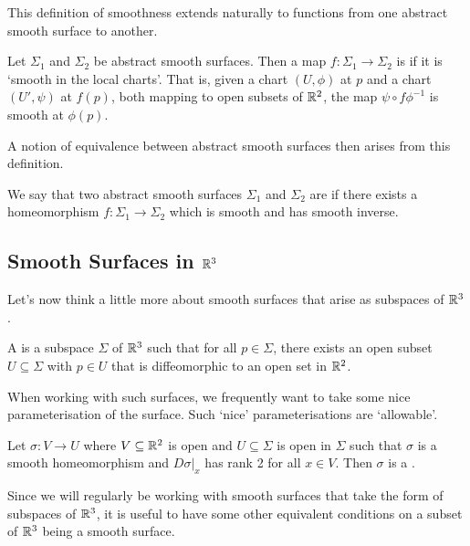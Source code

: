 \documentclass[a4paper]{article}
\begin{document}
This definition of smoothness extends naturally to functions from one abstract smooth surface to another.

\begin{definition}
    Let $\Sigma_1$ and $\Sigma_2$ be abstract smooth surfaces. Then a map $f: \Sigma_1 \rightarrow \Sigma_2$ is  if it is `smooth in the local charts'. That is, given a chart $(U, \phi)$ at $p$ and a chart $(U', \psi)$ at $f(p)$, both mapping to open subsets of $\mathbb{R}^2$, the map $\psi \circ f \phi^{-1}$ is smooth at $\phi(p)$.
\end{definition}


A notion of equivalence between abstract smooth surfaces then arises from this definition.

\begin{definition}
    We say that two abstract smooth surfaces $\Sigma_1$ and $\Sigma_2$ are  if there exists a homeomorphism $f: \Sigma_1 \rightarrow \Sigma_2$ which is smooth and has smooth inverse.
\end{definition}

\subsection{Smooth Surfaces in \texorpdfstring{$\mathbb{R}^3$}{R3}}

Let's now think a little more about smooth surfaces that arise as subspaces of $\mathbb{R}^3$.

\begin{definition}
    A  is a subspace $\Sigma$ of $\mathbb{R}^3$ such that for all $p \in \Sigma$, there exists an open subset $U \subseteq \Sigma$ with $p \in U$ that is diffeomorphic to an open set in $\mathbb{R}^2$.
\end{definition}

When working with such surfaces, we frequently want to take some nice parameterisation of the surface. Such `nice' parameterisations are `allowable'.

\begin{definition}
    Let $\sigma: V \rightarrow U$ where $V \subseteq \mathbb{R}^2$ is open and $U \subseteq \Sigma$ is open in $\Sigma$ such that $\sigma$ is a smooth homeomorphism and $\left.D\sigma \right|_x$ has rank 2 for all $x \in V$. Then $\sigma$ is a .
\end{definition}

Since we will regularly be working with smooth surfaces that take the form of subspaces of $\mathbb{R}^3$, it is useful to have some other equivalent conditions on a subset of $\mathbb{R}^3$ being a smooth surface.
\end{document}
